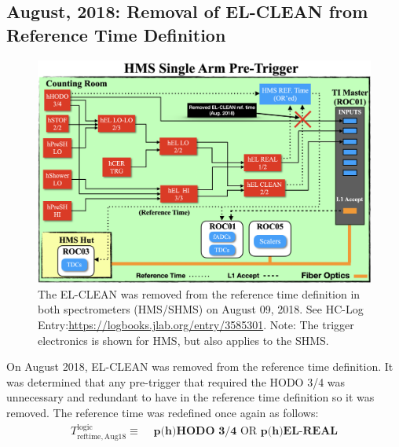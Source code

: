 \documentclass[11pt]{article}
\begin{document}
\subsection{August, 2018: Removal of EL-CLEAN from Reference Time Definition}\label{ssec:aug2018}
\begin{figure}[H]
  \centering
  \includegraphics[scale=0.38]{./Aug2018_trigger_change.png}
  \caption{The EL-CLEAN was removed from the reference time definition in both spectrometers (HMS/SHMS) on August 09, 2018. See HC-Log Entry:\url{https://logbooks.jlab.org/entry/3585301}. Note: The trigger
  electronics is shown for HMS, but also applies to the SHMS.}
  \label{fig:elclean_refTime_remove}
\end{figure}
On August 2018, EL-CLEAN was removed from the reference time definition. It was determined that any pre-trigger that required the HODO 3/4 was unnecessary and redundant to have in the
reference time definition so it was removed. The reference time was redefined once again as follows:
\begin{align}
  T^{\mathrm{logic}}_{\mathrm{reftime,Aug18}} \equiv &\textbf{ p(h)HODO 3/4} \text{ OR } \textbf{p(h)EL-REAL}
  \label{eq:refTime_def3}
\end{align}
\end{document}
